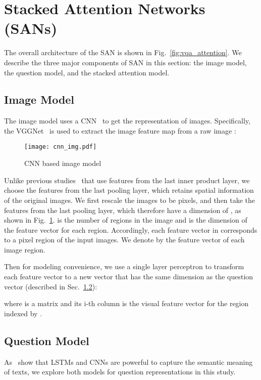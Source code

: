 \documentclass[10pt,twocolumn,letterpaper]{article}
\begin{document}
\vspace{-0.2cm}
\section{Stacked Attention Networks (SANs)}
\label{sec:model}

The overall architecture of the SAN is shown in
Fig.~\ref{fig:vqa_attention}. We describe the three major components of SAN in
this section: the image model, the question model, and the stacked attention
model.

\vspace{-0.2cm}
\subsection{Image Model}
The image model uses a CNN~\cite{krizhevsky2012imagenet, simonyan2014very,
  szegedy2014going} to get the representation of images. Specifically, the
VGGNet~\cite{simonyan2014very} is used to extract the image feature map 
from a raw image :
\begin{figure}[tbh]
  \vspace{-0.5cm}
    \texttt{[image: cnn\_img.pdf]}
    \centering
    \caption{CNN based image model}
    \label{fig:cnn_img}
  \vspace{-0.5cm}
\end{figure}


Unlike previous studies~\cite{ren2015imageqa,ma2015learning,gao2015you} that
use features from the last inner product layer, we choose the features 
from the last pooling layer, which retains spatial information of the original
images. We first rescale the images to be  pixels, and then take
the features from the last pooling layer, which therefore have a dimension of
, as shown in Fig.~\ref{fig:cnn_img}.  is
the number of regions in the image and  is the dimension of the feature
vector for each region. Accordingly, each feature vector in  corresponds
to a  pixel region of the input images. We denote by
 the feature vector of each image region.

Then for modeling convenience, we use a single layer perceptron to transform
each feature vector to a new vector that has the same dimension as the question
vector (described in Sec.~\ref{sec:question_model}):

where  is a matrix and its i-th column  is the visual feature
vector for the region indexed by .

\subsection{Question Model}
\label{sec:question_model}
As~\cite{sutskever2014sequence, shen2014latent, fang2014captions} show that
LSTMs and CNNs are powerful to capture the semantic meaning of texts, we
explore both models for question representations in this study.
\end{document}
